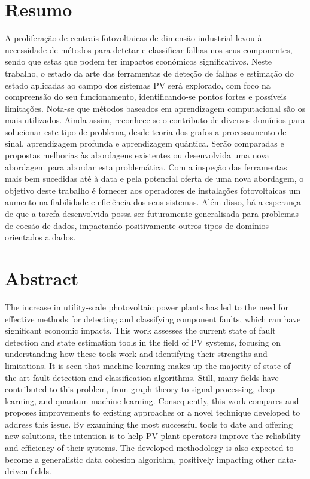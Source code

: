 \chapter*{Resumo}

A proliferação de centrais fotovoltaicas de dimensão industrial levou à necessidade de métodos para detetar e classificar falhas nos seus componentes, sendo que estas que podem ter impactos económicos significativos. Neste trabalho, o estado da arte das ferramentas de deteção de falhas e estimação do estado aplicadas ao campo dos sistemas PV será explorado, com foco na compreensão do seu funcionamento, identificando-se pontos fortes e possíveis limitações. Nota-se que métodos baseados em aprendizagem computacional são os mais utilizados. Ainda assim, reconhece-se o contributo de diversos domínios para solucionar este tipo de problema, desde teoria dos grafos a processamento de sinal, aprendizagem profunda e aprendizagem quântica. Serão comparadas e propostas melhorias às abordagens existentes ou desenvolvida uma nova abordagem para abordar esta problemática. Com a inspeção das ferramentas mais bem sucedidas até à data e pela potencial oferta de uma nova abordagem, o objetivo deste trabalho é fornecer aos operadores de instalações fotovoltaicas um aumento na fiabilidade e eficiência dos seus sistemas. Além disso, há a esperança de que a tarefa desenvolvida possa ser futuramente generalisada para problemas de coesão de dados, impactando positivamente outros tipos de domínios orientados a dados.


\chapter*{Abstract}

The increase in utility-scale photovoltaic power plants has led to the need for effective methods for detecting and classifying component faults, which can have significant economic impacts. This work assesses the current state of fault detection and state estimation tools in the field of PV systems, focusing on understanding how these tools work and identifying their strengths and limitations. It is seen that machine learning makes up the majority of state-of-the-art fault detection and classification algorithms. Still, many fields have contributed to this problem, from graph theory to signal processing, deep learning, and quantum machine learning. Consequently, this work compares and proposes improvements to existing approaches or a novel technique developed to address this issue. By examining the most successful tools to date and offering new solutions, the intention is to help PV plant operators improve the reliability and efficiency of their systems. The developed methodology is also expected to become a generalistic data cohesion algorithm, positively impacting other data-driven fields.